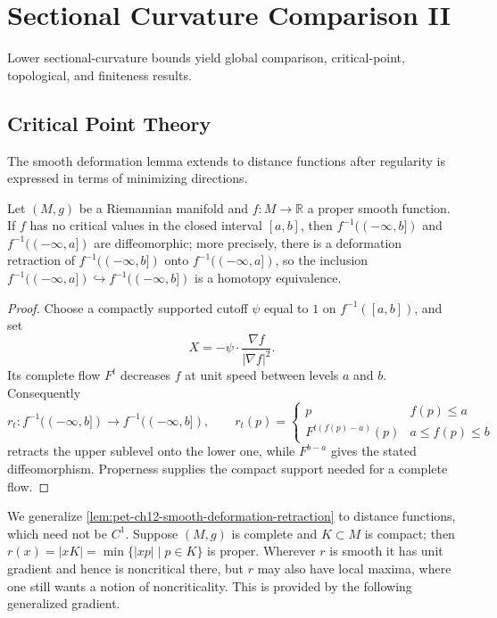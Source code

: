 \chapter{Sectional Curvature Comparison II}
\label{chap:pet-sectional-curvature-comparison-ii}

Lower sectional-curvature bounds yield global comparison, critical-point,
topological, and finiteness results.

\section{Critical Point Theory}

The smooth deformation lemma extends to distance functions after regularity is
expressed in terms of minimizing directions.

\begin{lemma}
  \label{lem:pet-ch12-smooth-deformation-retraction}
  Let $(M,g)$ be a Riemannian manifold and $f:M\to\mathbb{R}$ a proper smooth
  function. If $f$ has no critical values in the closed interval $[a,b]$, then
  $f^{-1}((-\infty,b])$ and $f^{-1}((-\infty,a])$ are diffeomorphic; more
  precisely, there is a deformation retraction of $f^{-1}((-\infty,b])$ onto
  $f^{-1}((-\infty,a])$, so the inclusion
  $f^{-1}((-\infty,a])\hookrightarrow f^{-1}((-\infty,b])$ is a homotopy
  equivalence.
\end{lemma}
\begin{proof}
  \sketch
  Choose a compactly supported cutoff $\psi$ equal to $1$ on
  $f^{-1}([a,b])$, and set
  \[
    X=-\psi\cdot\frac{\nabla f}{|\nabla f|^2}.
  \]
  Its complete flow $F^t$ decreases $f$ at unit speed between levels $a$ and
  $b$. Consequently
  \[
    r_t:f^{-1}((-\infty,b])\to f^{-1}((-\infty,b]),\qquad
    r_t(p)=\begin{cases}p&f(p)\le a\\F^{t(f(p)-a)}(p)&a\le f(p)\le b\end{cases}
  \]
  retracts the upper sublevel onto the lower one, while $F^{b-a}$ gives the
  stated diffeomorphism. Properness supplies the compact support needed for a
  complete flow.
\end{proof}

We generalize \cref{lem:pet-ch12-smooth-deformation-retraction} to distance
functions, which need not be $C^1$. Suppose $(M,g)$ is complete and
$K\subset M$ is compact; then $r(x)=|xK|=\min\{|xp|\mid p\in K\}$ is proper.
Wherever $r$ is smooth it has unit gradient and hence is noncritical there,
but $r$ may also have local maxima, where one still wants a notion of
noncriticality. This is provided by the following generalized gradient.

